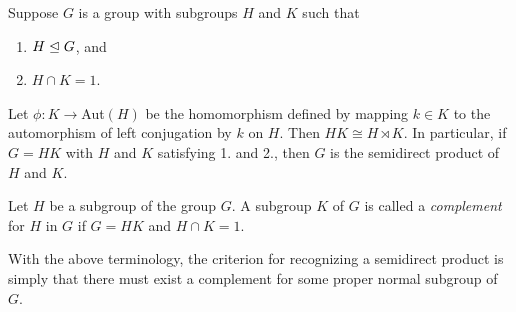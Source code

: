 \documentclass[../main]{subfiles}
\begin{document}
\begin{thm}
 Suppose $G$ is a group with subgroups $H$ and $K$ such that
 \begin{enumerate}
  \item $H \trianglelefteq G$, and 
  
  \item $H \cap K = 1$.
 \end{enumerate}
 Let $\phi \colon K \to$Aut$(H)$ be the homomorphism defined by mapping $k \in K$ to the automorphism of left conjugation by $k$ on $H$. Then $HK \cong H \rtimes K$. In particular, if $G = HK$ with $H$ and $K$ satisfying 1. and 2., then $G$ is the semidirect product of $H$ and $K$. 
\end{thm}


\begin{dfn}
 Let $H$ be a subgroup of the group $G$. A subgroup $K$ of $G$ is called a \textit{complement} for $H$ in $G$ if $G = HK$ and $H \cap K = 1$.
\end{dfn}

\begin{nt}
 With the above terminology, the criterion for recognizing a semidirect product is simply that there must exist a complement for some proper normal subgroup of $G$. 
\end{nt}
\end{document}
